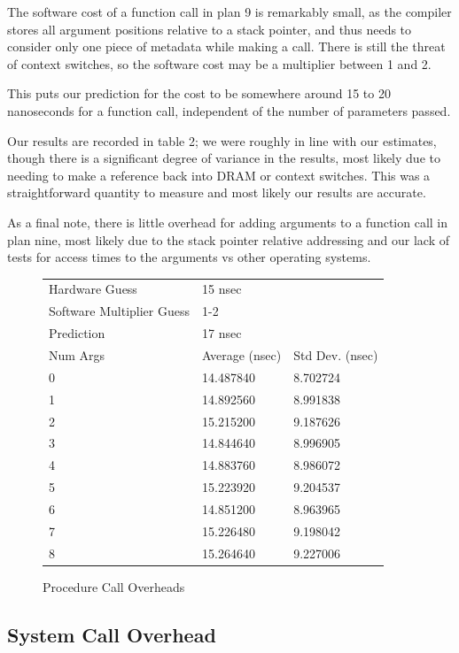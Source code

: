 \documentclass[letterpaper,twocolumn,10pt]{article}
\begin{document}
The software cost of a function call in plan 9 is remarkably small, as the compiler stores all argument positions relative to a stack pointer, and thus needs to consider only one piece of metadata while making a call. There is still the threat of context switches, so the software cost may be a multiplier between 1 and 2.

This puts our prediction for the cost to be somewhere around 15 to 20 nanoseconds for a function call, independent of the number of parameters passed.

Our results are recorded in table 2; we were roughly in line with our estimates, though there is a significant degree of variance in the results, most likely due to needing to make a reference back into DRAM or context switches. This was a straightforward quantity to measure and most likely our results are accurate. 

As a final note, there is little overhead for adding arguments to a function call in plan nine, most likely due to the stack pointer relative addressing and our lack of tests for access times to the arguments vs other operating systems.

\begin{figure}
	\centering
\begin{tabular}{lll}
Hardware Guess       & 15 nsec & \\
Software Multiplier Guess       & 1-2 &  \\
Prediction       & 17 nsec &  \\
    Num Args & Average (nsec)   & Std Dev. (nsec)  \\
0 & 14.487840& 8.702724 \\
1 & 14.892560& 8.991838 \\
2 & 15.215200& 9.187626 \\
3 & 14.844640& 8.996905 \\
4 & 14.883760& 8.986072 \\
5 & 15.223920& 9.204537 \\
6 & 14.851200& 8.963965 \\
7 & 15.226480& 9.198042 \\
8 & 15.264640& 9.227006
\end{tabular}
\caption{Procedure Call Overheads}
\label{tab:proccalloverheads}
\end{figure}

\subsection{System Call Overhead}
\end{document}
